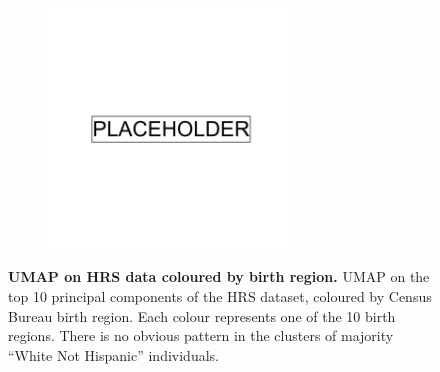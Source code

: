 \begin{figure}
    \centering
    \begin{subfigure}{\textwidth}
    \includegraphics[width=0.7\textwidth]{placeholder.png}
    \end{subfigure}
    \caption[UMAP on HRS data coloured by birth region]{\textbf{UMAP on HRS data coloured by birth region.} UMAP on the top 10 principal components of the HRS dataset, coloured by Census Bureau birth region. Each colour represents one of the 10 birth regions. There is no obvious pattern in the clusters of majority ``White Not Hispanic'' individuals.}
    \label{fig:supp_hrs_born}
\end{figure}

\newpage


